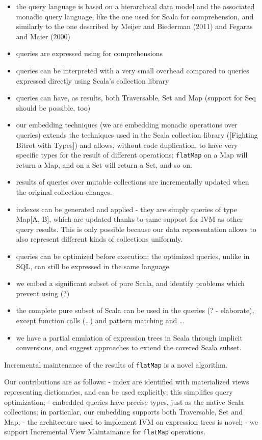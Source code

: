 \documentclass{article}
\begin{document}
\begin{itemize}
\item
  the query language is based on a hierarchical data model and the
  associated monadic query language, like the one used for Scala for
  comprehension, and similarly to the one described by Meijer and
  Biederman (2011) and Fegaras and Maier (2000)
\item
  queries are expressed using for comprehensions
\item
  queries can be interpreted with a very small overhead compared to
  queries expressed directly using Scala's collection library
\item
  queries can have, as results, both Traversable, Set and Map (support
  for Seq should be possible, too)
\item
  our embedding techniques (we are embedding monadic operations over
  queries) extends the techniques used in the Scala collection library
  ({[}Fighting Bitrot with Types{]}) and allows, without code
  duplication, to have very specific types for the result of different
  operations; \texttt{flatMap} on a Map will return a Map, and on a Set
  will return a Set, and so on.
\item
  results of queries over mutable collections are incrementally updated
  when the original collection changes.
\item
  indexes can be generated and applied - they are simply queries of type
  Map{[}A, B{]}, which are updated thanks to same support for IVM as
  other query results. This is only possible because our data
  representation allows to also represent different kinds of collections
  uniformly.
\item
  queries can be optimized before execution; the optimized queries,
  unlike in SQL, can still be expressed in the same language
\item
  we embed a significant subset of pure Scala, and identify problems
  which prevent using (?)
\item
  the complete pure subset of Scala can be used in the queries (? -
  elaborate), except function calls (\ldots{}) and pattern matching and
  \ldots{}
\item
  we have a partial emulation of expression trees in Scala through
  implicit conversions, and suggest approaches to extend the covered
  Scala subset.
\end{itemize}
Incremental maintenance of the results of \texttt{flatMap} is a novel
algorithm.

Our contributions are as follows: - index are identified with
materialized views representing dictionaries, and can be used
explicitly; this simplifies query optimization; - embedded queries have
precise types, just as the native Scala collections; in particular, our
embedding supports both Traversable, Set and Map; - the architecture
used to implement IVM on expression trees is novel; - we support
Incremental View Maintainance for \texttt{flatMap} operations.
\end{document}
